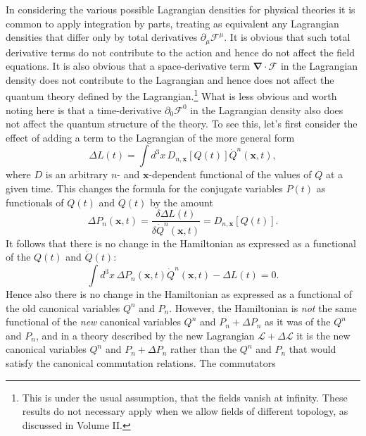 In considering the various possible Lagrangian densities for physical
theories it is common to apply integration by parts, treating as equivalent
any Lagrangian densities that differ only by total derivatives
$\partial_\mu\mathcal{F}^\mu$. It is obvious that such total derivative terms do
not contribute to the action and hence do not affect the field equations. It
is also obvious that a space-derivative term $\boldsymbol{\nabla}\cdot\boldsymbol{\mathcal{F}}$
in the Lagrangian density does not contribute to the Lagrangian and hence
does not affect the quantum theory defined by the Lagrangian.\footnote{This
is under the usual assumption, that the fields vanish at infinity. These
results do not necessary apply when we allow fields of different topology,
as discussed in Volume II.} What is less obvious and worth noting here is that
a time-derivative $\partial_0\mathcal{F}^0$ in the Lagrangian density also does
not affect the quantum structure of the theory. To see this, let's first consider
the effect of adding a term to the Lagrangian of the more general form
\begin{equation}
\Delta L(t)=\int d^3x\,D_{n,\mathbf{x}}[Q(t)]\dot Q^n(\mathbf{x},t),
\tag{7.2.36}\label{eq:7.2.36}
\end{equation}
where $D$ is an arbitrary $n$- and $\mathbf{x}$-dependent functional of the values
of $Q$ at a given time. This changes the formula for the conjugate variables
$P(t)$ as functionals of $Q(t)$ and $\dot Q(t)$ by the amount
\begin{equation}
\Delta P_n(\mathbf{x},t)=
\frac{\delta\Delta L(t)}{\delta\dot Q^n(\mathbf{x},t)}
=D_{n,\mathbf{x}}[Q(t)].
\tag{7.2.37}\label{eq:7.2.37}
\end{equation}
It follows that there is no change in the Hamiltonian as expressed as a
functional of the $Q(t)$ and $\dot Q(t)$:
\begin{equation}
\int d^3x\,\Delta P_n(\mathbf{x},t)\dot Q^n(\mathbf{x},t)-\Delta L(t)=0.
\tag{7.2.38}\label{eq:7.2.38}
\end{equation}
Hence also there is no change in the Hamiltonian as expressed as a
functional of the old canonical variables $Q^n$ and $P_n$. However, the
Hamiltonian is \textit{not} the same functional of the \textit{new} canonical variables
$Q^n$ and $P_n+\Delta P_n$ as it was of the $Q^n$ and $P_n$, and in a theory
described by the new Lagrangian $\mathcal{L}+\Delta\mathcal{L}$ it is the new
canonical variables $Q^n$ and $P_n+\Delta P_n$ rather than the $Q^n$ and $P_n$
that would satisfy the canonical commutation relations. The commutators
